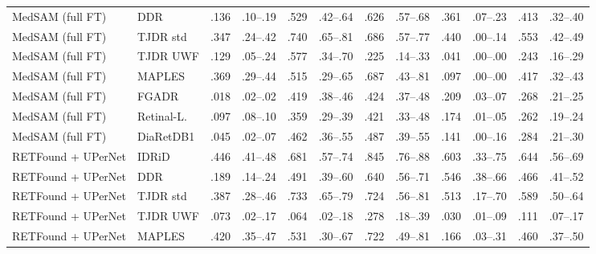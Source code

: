 \begin{landscape}
{\begin{longtable}{l l c c c c c c c c c c}
MedSAM (full FT) & DDR & .136 & \scriptsize .10--.19 & .529 & \scriptsize .42--.64 & .626 & \scriptsize .57--.68 & .361 & \scriptsize .07--.23 & .413 & \scriptsize .32--.40 \\
MedSAM (full FT) & TJDR std & .347 & \scriptsize .24--.42 & .740 & \scriptsize .65--.81 & .686 & \scriptsize .57--.77 & .440 & \scriptsize .00--.14 & .553 & \scriptsize .42--.49 \\
MedSAM (full FT) & TJDR UWF & .129 & \scriptsize .05--.24 & .577 & \scriptsize .34--.70 & .225 & \scriptsize .14--.33 & .041 & \scriptsize .00--.00 & .243 & \scriptsize .16--.29 \\
MedSAM (full FT) & MAPLES & .369 & \scriptsize .29--.44 & .515 & \scriptsize .29--.65 & .687 & \scriptsize .43--.81 & .097 & \scriptsize .00--.00 & .417 & \scriptsize .32--.43 \\
MedSAM (full FT) & FGADR & .018 & \scriptsize .02--.02 & .419 & \scriptsize .38--.46 & .424 & \scriptsize .37--.48 & .209 & \scriptsize .03--.07 & .268 & \scriptsize .21--.25 \\
MedSAM (full FT) & Retinal-L. & .097 & \scriptsize .08--.10 & .359 & \scriptsize .29--.39 & .421 & \scriptsize .33--.48 & .174 & \scriptsize .01--.05 & .262 & \scriptsize .19--.24 \\
MedSAM (full FT) & DiaRetDB1 & .045 & \scriptsize .02--.07 & .462 & \scriptsize .36--.55 & .487 & \scriptsize .39--.55 & .141 & \scriptsize .00--.16 & .284 & \scriptsize .21--.30 \\
RETFound + UPerNet & IDRiD & .446 & \scriptsize .41--.48 & .681 & \scriptsize .57--.74 & .845 & \scriptsize .76--.88 & .603 & \scriptsize .33--.75 & .644 & \scriptsize .56--.69 \\
RETFound + UPerNet & DDR & .189 & \scriptsize .14--.24 & .491 & \scriptsize .39--.60 & .640 & \scriptsize .56--.71 & .546 & \scriptsize .38--.66 & .466 & \scriptsize .41--.52 \\
RETFound + UPerNet & TJDR std & .387 & \scriptsize .28--.46 & .733 & \scriptsize .65--.79 & .724 & \scriptsize .56--.81 & .513 & \scriptsize .17--.70 & .589 & \scriptsize .50--.64 \\
RETFound + UPerNet & TJDR UWF & .073 & \scriptsize .02--.17 & .064 & \scriptsize .02--.18 & .278 & \scriptsize .18--.39 & .030 & \scriptsize .01--.09 & .111 & \scriptsize .07--.17 \\
RETFound + UPerNet & MAPLES & .420 & \scriptsize .35--.47 & .531 & \scriptsize .30--.67 & .722 & \scriptsize .49--.81 & .166 & \scriptsize .03--.31 & .460 & \scriptsize .37--.50 \\

\end{longtable}}
\end{landscape}
